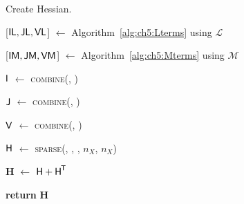 \begin{vAlgorithm}[!ht]{1\columnwidth}{0em}
\LinesNumbered
\DontPrintSemicolon


\caption{Create Hessian.}\label{alg:ch5:hessian}


 [$\textup{\textsf{IL}}, \textup{\textsf{JL}}, \textup{\textsf{VL}}$] $\gets$ Algorithm~\ref{alg:ch5:Lterms} using $\mathcal{L}$  

[$\textup{\textsf{IM}}, \textup{\textsf{JM}}, \textup{\textsf{VM}}$] $\gets$ Algorithm~\ref{alg:ch5:Mterms} using $\mathcal{M}$ 

$\textup{\textsf{I}}$ $\gets$ \textsc{combine}(, )

$\textup{\textsf{J}}$ $\gets$ \textsc{combine}(, )

$\textup{\textsf{V}}$ $\gets$ \textsc{combine}(, )

$\textup{\textsf{H}}$ $\gets$ \textsc{sparse}(, , , $n_X$, $n_X$) 

$\mathbf{H}$ $\gets$ $\textup{\textsf{H}} + \textup{\textsf{H}}^{\mkern-1.5mu\mathsf{T}}$ 

\textbf{return} $\mathbf{H}$ 

\end{vAlgorithm}